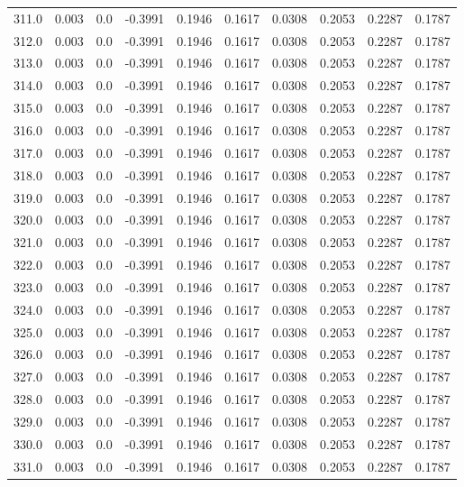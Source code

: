 \begin{longtable}{lrrrrrrrrr}
311.0 & 0.003 & 0.0 & -0.3991 & 0.1946 & 0.1617 & 0.0308 & 0.2053 & 0.2287 & 0.1787 \\
312.0 & 0.003 & 0.0 & -0.3991 & 0.1946 & 0.1617 & 0.0308 & 0.2053 & 0.2287 & 0.1787 \\
313.0 & 0.003 & 0.0 & -0.3991 & 0.1946 & 0.1617 & 0.0308 & 0.2053 & 0.2287 & 0.1787 \\
314.0 & 0.003 & 0.0 & -0.3991 & 0.1946 & 0.1617 & 0.0308 & 0.2053 & 0.2287 & 0.1787 \\
315.0 & 0.003 & 0.0 & -0.3991 & 0.1946 & 0.1617 & 0.0308 & 0.2053 & 0.2287 & 0.1787 \\
316.0 & 0.003 & 0.0 & -0.3991 & 0.1946 & 0.1617 & 0.0308 & 0.2053 & 0.2287 & 0.1787 \\
317.0 & 0.003 & 0.0 & -0.3991 & 0.1946 & 0.1617 & 0.0308 & 0.2053 & 0.2287 & 0.1787 \\
318.0 & 0.003 & 0.0 & -0.3991 & 0.1946 & 0.1617 & 0.0308 & 0.2053 & 0.2287 & 0.1787 \\
319.0 & 0.003 & 0.0 & -0.3991 & 0.1946 & 0.1617 & 0.0308 & 0.2053 & 0.2287 & 0.1787 \\
320.0 & 0.003 & 0.0 & -0.3991 & 0.1946 & 0.1617 & 0.0308 & 0.2053 & 0.2287 & 0.1787 \\
321.0 & 0.003 & 0.0 & -0.3991 & 0.1946 & 0.1617 & 0.0308 & 0.2053 & 0.2287 & 0.1787 \\
322.0 & 0.003 & 0.0 & -0.3991 & 0.1946 & 0.1617 & 0.0308 & 0.2053 & 0.2287 & 0.1787 \\
323.0 & 0.003 & 0.0 & -0.3991 & 0.1946 & 0.1617 & 0.0308 & 0.2053 & 0.2287 & 0.1787 \\
324.0 & 0.003 & 0.0 & -0.3991 & 0.1946 & 0.1617 & 0.0308 & 0.2053 & 0.2287 & 0.1787 \\
325.0 & 0.003 & 0.0 & -0.3991 & 0.1946 & 0.1617 & 0.0308 & 0.2053 & 0.2287 & 0.1787 \\
326.0 & 0.003 & 0.0 & -0.3991 & 0.1946 & 0.1617 & 0.0308 & 0.2053 & 0.2287 & 0.1787 \\
327.0 & 0.003 & 0.0 & -0.3991 & 0.1946 & 0.1617 & 0.0308 & 0.2053 & 0.2287 & 0.1787 \\
328.0 & 0.003 & 0.0 & -0.3991 & 0.1946 & 0.1617 & 0.0308 & 0.2053 & 0.2287 & 0.1787 \\
329.0 & 0.003 & 0.0 & -0.3991 & 0.1946 & 0.1617 & 0.0308 & 0.2053 & 0.2287 & 0.1787 \\
330.0 & 0.003 & 0.0 & -0.3991 & 0.1946 & 0.1617 & 0.0308 & 0.2053 & 0.2287 & 0.1787 \\
331.0 & 0.003 & 0.0 & -0.3991 & 0.1946 & 0.1617 & 0.0308 & 0.2053 & 0.2287 & 0.1787 \\

\end{longtable}
